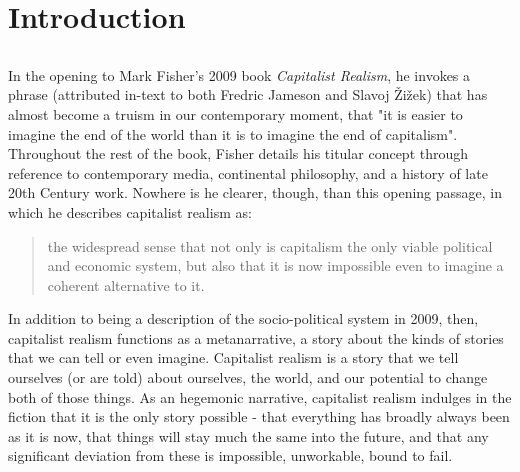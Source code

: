 \chapter{Introduction}
\label{}

\section{}
\label{sec:}

In the opening to Mark Fisher's 2009 book \emph{Capitalist Realism}, he invokes a phrase (attributed in-text to both Fredric Jameson and Slavoj Žižek) that has almost become a truism in our contemporary moment, that "it is easier to imagine the end of the world than it is to imagine the end of capitalism". Throughout the rest of the book, Fisher details his titular concept through reference to contemporary media, continental philosophy, and a history of late 20th Century work. Nowhere is he clearer, though, than this opening passage, in which he describes capitalist realism as:

\begin{quote}
    the widespread sense that not only is capitalism the only viable political and economic system, but also that it is now impossible even to imagine a coherent alternative to it. \citep{fisher_capitalist_2009}
\end{quote}

In addition to being a description of the socio-political system in 2009, then, capitalist realism functions as a metanarrative, a story about the kinds of stories that we can tell or even imagine. Capitalist realism is a story that we tell ourselves (or are told) about ourselves, the world, and our potential to change both of those things. As an hegemonic narrative, capitalist realism indulges in the fiction that it is the only story possible - that everything has broadly always been as it is now, that things will stay much the same into the future, and that any significant deviation from these is impossible, unworkable, bound to fail. 


